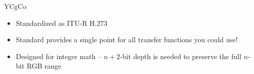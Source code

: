 \documentclass[aspectratio=169,usepdftitle=false]{fireshonks}
\begin{document}
\begin{frame}{YCgCo}
    \begin{itemize}
        \item Standardized as ITU-R H.273 \parencite*{ycocg}
        \item Standard provides a single point for all transfer functions you could use!
        \item Designed for integer math -- $n+2$-bit depth is needed to preserve the full $n$-bit RGB range
    \end{itemize}

\end{frame}
\end{document}
